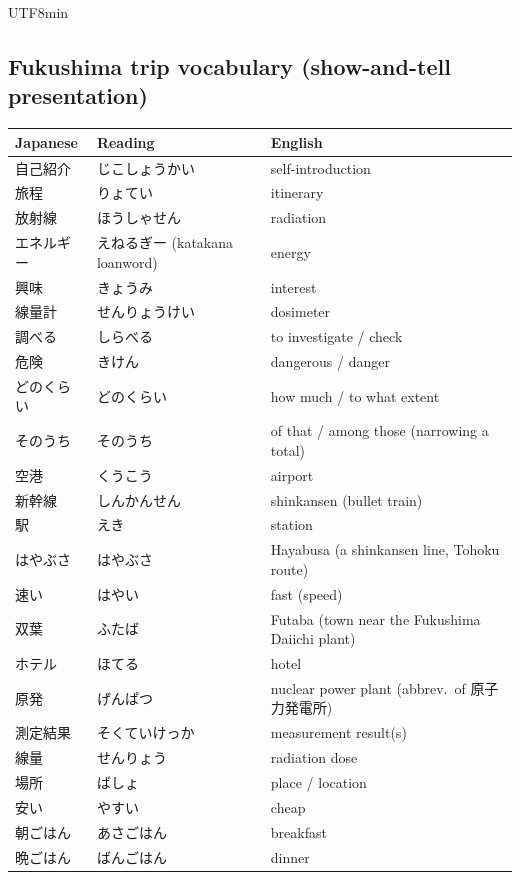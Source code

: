 \documentclass[11pt]{article}
\begin{document}
\begin{CJK}{UTF8}{min}
\subsection{Fukushima trip vocabulary (show-and-tell presentation)}
\begin{center}
\begin{tabular}{@{}lll@{}}
\toprule
Japanese & Reading & English \\
\midrule
自己紹介 & じこしょうかい & self-introduction \\
旅程     & りょてい       & itinerary \\
放射線   & ほうしゃせん   & radiation \\
エネルギー & えねるぎー (katakana loanword) & energy \\
興味     & きょうみ       & interest \\
線量計   & せんりょうけい & dosimeter \\
調べる   & しらべる       & to investigate / check \\
危険     & きけん         & dangerous / danger \\
どのくらい & どのくらい   & how much / to what extent \\
そのうち & そのうち       & of that / among those (narrowing a total) \\
空港     & くうこう       & airport \\
新幹線   & しんかんせん   & shinkansen (bullet train) \\
駅       & えき           & station \\
はやぶさ & はやぶさ       & Hayabusa (a shinkansen line, Tohoku route) \\
速い     & はやい         & fast (speed) \\
双葉     & ふたば         & Futaba (town near the Fukushima Daiichi plant) \\
ホテル   & ほてる         & hotel \\
原発     & げんぱつ       & nuclear power plant (abbrev.\ of 原子力発電所) \\
測定結果 & そくていけっか & measurement result(s) \\
線量     & せんりょう     & radiation dose \\
場所     & ばしょ         & place / location \\
安い     & やすい         & cheap \\
朝ごはん & あさごはん     & breakfast \\
晩ごはん & ばんごはん     & dinner \\

\end{tabular}
\end{center}
\end{CJK}
\end{document}
